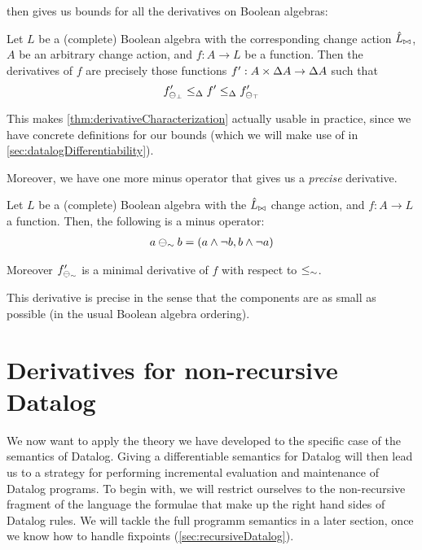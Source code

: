  then gives us bounds for
all the derivatives on Boolean algebras:

\begin{corollary}
\label{cor:booleanCharacterization}
  Let $L$ be a (complete) Boolean algebra with the corresponding change action
  $\hat{L}_{\bowtie}$, $A$ be an arbitrary change action, and $f: A \rightarrow
  L$ be a function. Then the derivatives of $f$ are precisely those functions
  $f': A \times \Delta A \rightarrow \Delta A$ such that
  \begin{displaymath}
    f'_{\ominus_{\bot}}
    \leq_\Delta
    f'
    \leq_\Delta
    f'_{\ominus_{\top}}
  \end{displaymath}
\end{corollary}

This makes \cref{thm:derivativeCharacterization} actually usable in practice, since
we have concrete definitions for our bounds (which we will make use of in \cref{sec:datalogDifferentiability}).

Moreover, we have one more minus operator that gives us a \emph{precise}
derivative.


\begin{prop}
  Let $L$ be a (complete) Boolean algebra with the $\hat{L}_{\bowtie}$ change action, and
  $f: A \rightarrow L$ a function.
  Then, the following is a minus operator:
  \begin{align*}
    a \ominus_\sim b &= (a \wedge \neg b, b \wedge \neg a)\\
  \end{align*}

  Moreover $f'_{\ominus_\sim}$ is a minimal derivative of $f$ with respect to $\leq_\sim$.
\end{prop}

This derivative is precise in the sense that the components are as small as
possible (in the usual Boolean algebra ordering).

\section{Derivatives for non-recursive Datalog}
\label{sec:nonRecursiveDatalog}


We now want to apply the theory we have developed to the specific case of the semantics
of Datalog. Giving a differentiable semantics for Datalog will then
lead us to a strategy for performing incremental evaluation and maintenance of Datalog programs. 
To begin with, we will restrict ourselves to the non-recursive fragment of the
language \textemdash{} the formulae that make up the right hand sides of Datalog
rules. We will tackle the full programm semantics in a later section, once we
know how to handle fixpoints (\cref{sec:recursiveDatalog}).

